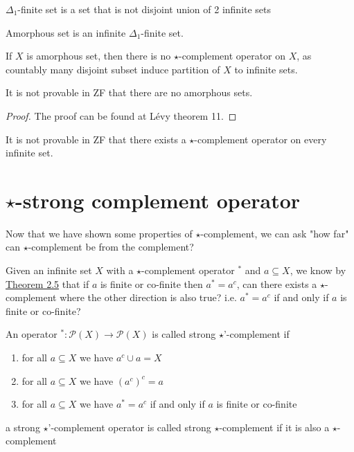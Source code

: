 	\begin{definition}
		$\Delta_1$-finite set is a set that is not disjoint union of 2 infinite sets
	\end{definition}
	\begin{definition}
		Amorphous set is an infinite $\Delta_1$-finite set.
	\end{definition}
	\begin{remark}
		If $X$ is amorphous set, then there is no $\star$-complement operator on $X$, as countably many disjoint subset induce partition of $X$ to infinite sets.
	\end{remark}
	
	\begin{theorem}\label{thm:2.11}
		It is not provable in ZF that there are no amorphous sets.
	\end{theorem}
	\begin{proof}
		The proof can be found at Lévy\cite{TheIndependenceOfVariousDefinitionsOfFiniteness} theorem 11.
	\end{proof}
	
	
	\begin{corollary}
		It is not provable in ZF that there exists a $\star$-complement operator on every infinite set.
	\end{corollary}
	
	\section{$\star$-strong complement operator}
	
	Now that we have shown some properties of $\star$-complement, we can ask "how far" can $\star$-complement be from the complement?
	
	Given an infinite set $X$ with a $\star$-complement operator $^*$ and $a\subseteq X$, we know by \hyperref[thm:2.5]{Theorem 2.5} that if $a$ is finite or co-finite then $a^*=a^c$, can there exists a $\star$-complement where the other direction is also true? i.e. $a^*=a^c$ if and only if $a$ is finite or co-finite?
	
	\begin{definition}
		An operator $^*:\mathcal P(X)\to\mathcal P(X)$ is called strong $\star$'-complement if 
		\begin{enumerate}
			\item{ for all $a\subseteq X$ we have $a^c\cup a=X$}
			\item{ for all $a\subseteq X$ we have $(a^c)^c=a$}
			\item{ for all $a\subseteq X$ we have $a^*=a^c$ if and only if $a$ is finite or co-finite}
		\end{enumerate}
		a strong $\star$'-complement operator is called strong $\star$-complement if it is also a $\star$-complement
	\end{definition}

